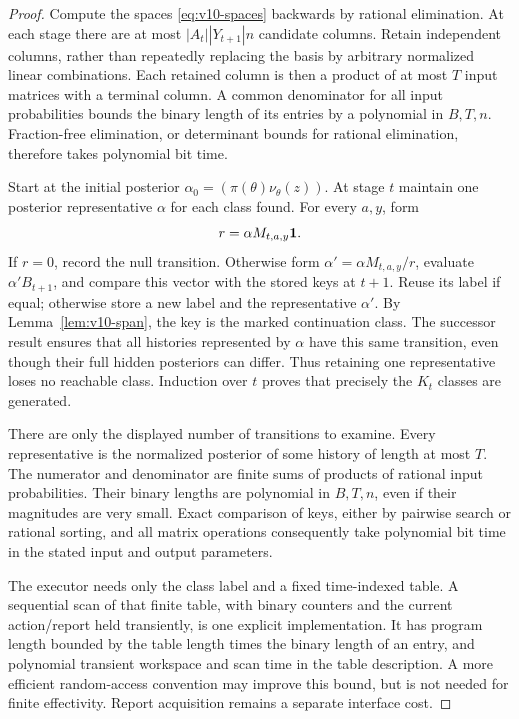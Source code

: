 \begin{proof}
Compute the spaces \eqref{eq:v10-spaces} backwards by rational
elimination. At each stage there are at most
$|A_t||Y_{t+1}|n$ candidate columns. Retain independent columns, rather
than repeatedly replacing the basis by arbitrary normalized linear
combinations. Each retained column is then a product of at most $T$
input matrices with a terminal column. A common denominator for all
input probabilities bounds the binary length of its entries by a
polynomial in $B,T,n$. Fraction-free elimination, or determinant
bounds for rational elimination, therefore takes polynomial bit time.

Start at the initial posterior $\alpha_0=(\pi(\theta)\nu_\theta(z))$.
At stage $t$ maintain one posterior representative $\alpha$ for each
class found. For every $a,y$, form
\[
 r=\alpha M_{t,a,y}\mathbf 1.
\]
If $r=0$, record the null transition. Otherwise form
$\alpha'=\alpha M_{t,a,y}/r$, evaluate $\alpha'B_{t+1}$, and compare
this vector with the stored keys at $t+1$. Reuse its label if equal;
otherwise store a new label and the representative $\alpha'$.
By Lemma~\ref{lem:v10-span}, the key is the marked continuation class.
The successor result ensures that all histories represented by
$\alpha$ have this same transition, even though their full hidden
posteriors can differ. Thus retaining one representative loses no
reachable class. Induction over $t$ proves that precisely the $K_t$
classes are generated.

There are only the displayed number of transitions to examine.
Every representative is the normalized posterior of some history of
length at most $T$. The numerator and denominator are finite sums
of products of rational input probabilities. Their binary lengths
are polynomial in $B,T,n$, even if their magnitudes are very small.
Exact comparison of keys, either by pairwise search or rational
sorting, and all matrix operations consequently take polynomial
bit time in the stated input and output parameters.

The executor needs only the class label and a fixed time-indexed
table. A sequential scan of that finite table, with binary counters
and the current action/report held transiently, is one explicit
implementation. It has program length bounded by the table length
times the binary length of an entry, and polynomial transient
workspace and scan time in the table description. A more efficient
random-access convention may improve this bound, but is not needed
for finite effectivity. Report acquisition remains a separate
interface cost.
\end{proof}

